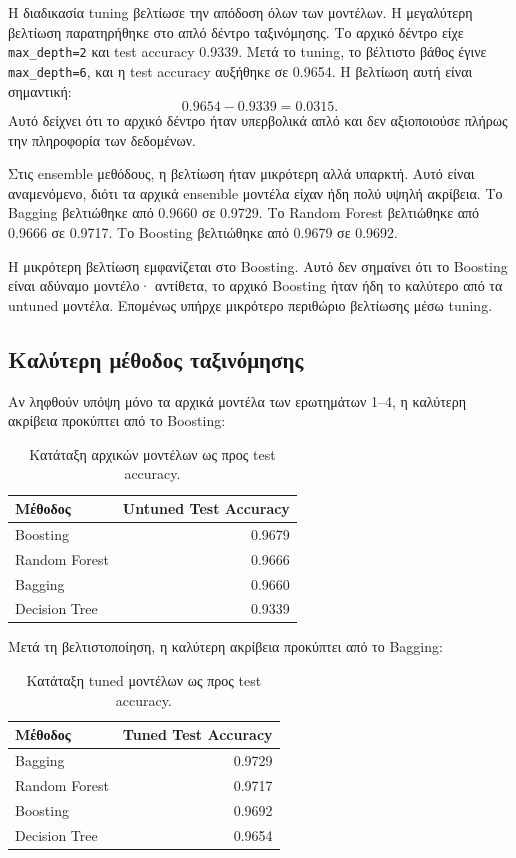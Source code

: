 \documentclass[12pt,a4paper]{article}
\newcommand{\code}[1]{\texttt{\textenglish{#1}}}
\begin{document}
Η διαδικασία tuning βελτίωσε την απόδοση όλων των μοντέλων. Η μεγαλύτερη
βελτίωση παρατηρήθηκε στο απλό δέντρο ταξινόμησης. Το αρχικό δέντρο είχε
\code{max\_depth=2} και test accuracy 0.9339. Μετά το tuning, το βέλτιστο
βάθος έγινε \code{max\_depth=6}, και η test accuracy αυξήθηκε σε 0.9654. Η
βελτίωση αυτή είναι σημαντική:
\[
    0.9654 - 0.9339 = 0.0315.
\]
Αυτό δείχνει ότι το αρχικό δέντρο ήταν υπερβολικά απλό και δεν αξιοποιούσε
πλήρως την πληροφορία των δεδομένων.

Στις ensemble μεθόδους, η βελτίωση ήταν μικρότερη αλλά υπαρκτή. Αυτό είναι
αναμενόμενο, διότι τα αρχικά ensemble μοντέλα είχαν ήδη πολύ υψηλή ακρίβεια.
Το Bagging βελτιώθηκε από 0.9660 σε 0.9729. Το Random Forest βελτιώθηκε από
0.9666 σε 0.9717. Το Boosting βελτιώθηκε από 0.9679 σε 0.9692.

Η μικρότερη βελτίωση εμφανίζεται στο Boosting. Αυτό δεν σημαίνει ότι το
Boosting είναι αδύναμο μοντέλο· αντίθετα, το αρχικό Boosting ήταν ήδη το
καλύτερο από τα untuned μοντέλα. Επομένως υπήρχε μικρότερο περιθώριο
βελτίωσης μέσω tuning.

\subsection{Καλύτερη μέθοδος ταξινόμησης}

Αν ληφθούν υπόψη μόνο τα αρχικά μοντέλα των ερωτημάτων 1--4, η καλύτερη
ακρίβεια προκύπτει από το Boosting:

\begin{table}[H]
\centering
\caption{Κατάταξη αρχικών μοντέλων ως προς test accuracy.}
\begin{tabular}{lr}
\toprule
\textbf{Μέθοδος} & \textbf{Untuned Test Accuracy} \\
\midrule
Boosting & 0.9679 \\
Random Forest & 0.9666 \\
Bagging & 0.9660 \\
Decision Tree & 0.9339 \\
\bottomrule
\end{tabular}
\end{table}

Μετά τη βελτιστοποίηση, η καλύτερη ακρίβεια προκύπτει από το Bagging:

\begin{table}[H]
\centering
\caption{Κατάταξη tuned μοντέλων ως προς test accuracy.}
\begin{tabular}{lr}
\toprule
\textbf{Μέθοδος} & \textbf{Tuned Test Accuracy} \\
\midrule
Bagging & 0.9729 \\
Random Forest & 0.9717 \\
Boosting & 0.9692 \\
Decision Tree & 0.9654 \\
\bottomrule
\end{tabular}
\end{table}
\end{document}
